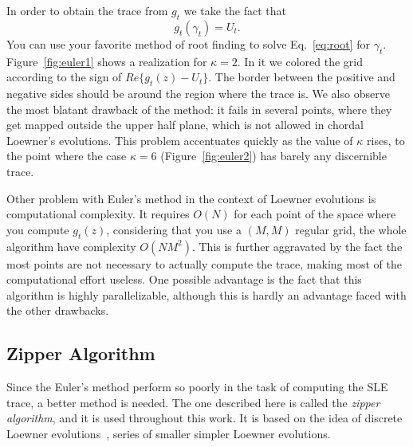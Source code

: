 In order to obtain the trace from $g_t$ we take the fact that
\begin{equation}
    g_t(\gamma_t) = U_t.
    \label{eq:root}
\end{equation}
You can use your favorite method of root finding to solve Eq.~\ref{eq:root} for
$\gamma_t$. Figure~\ref{fig:euler1} shows a realization for $\kappa=2$. In it
we colored the grid according to the sign of $Re\{g_t(z)-U_t\}$. The border
between the positive and negative sides should be around the region where the
trace is. We also observe the most blatant drawback of the method: it fails in
several points, where they get mapped outside the upper half plane, which is
not allowed in chordal Loewner's evolutions. This problem accentuates quickly
as the value of $\kappa$ rises, to the point where the case $\kappa=6$
(Figure~\ref{fig:euler2}) has barely any discernible trace.

Other problem with Euler's method in the context of Loewner evolutions is
computational complexity. It requires $O(N)$ for each point of the space where
you compute $g_t(z)$, considering that you use a $(M,M)$ regular grid, the whole
algorithm have complexity $O(NM^2)$. This is further aggravated by the fact the
most points are not necessary to actually compute the trace, making most of the
computational effort useless. One possible advantage is the fact that this
algorithm is highly parallelizable, although this is hardly an advantage faced
with the other drawbacks.

\subsection{Zipper Algorithm}
\label{ss:zipper}

Since the Euler's method perform so poorly in the task of computing the SLE
trace, a better method is needed. The one described here is called the
\textit{zipper algorithm}, and it is used throughout this work. It is based on
the idea of discrete Loewner evolutions~\cite{Bauer2003, Kennedy2009}, series
of smaller simpler Loewner evolutions.


